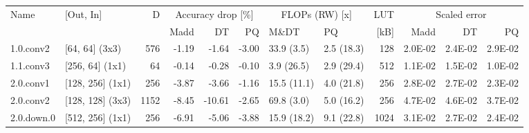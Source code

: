 \begin{table}
\centering
\begin{tabular}{llrrrrllrrrr}
\toprule
Name & [Out, In] & D & \multicolumn{3}{|c|}{Accuracy drop [\%]} & \multicolumn{2}{|c|}{FLOPs (RW) [x]} & LUT & \multicolumn{3}{|c|}{Scaled error} \\
 &  &  & Madd & DT & PQ & M\&DT & PQ & [kB] & Madd & DT & PQ \\
\midrule
1.0.conv2 & [64, 64] (3x3) & 576 & {\cellcolor[HTML]{F5FBB2}} \color[HTML]{000000} -1.19 & {\cellcolor[HTML]{FAFDB8}} \color[HTML]{000000} -1.64 & {\cellcolor[HTML]{FFF8B4}} \color[HTML]{000000} -3.00 & 33.9 (3.5) & 2.5 (18.3) & 128 & {\cellcolor[HTML]{F2FAAE}} \color[HTML]{000000} 2.0E-02 & {\cellcolor[HTML]{FFFEBE}} \color[HTML]{000000} 2.4E-02 & {\cellcolor[HTML]{FEEB9D}} \color[HTML]{000000} 2.9E-02 \\
1.1.conv3 & [256, 64] (1x1) & 64 & {\cellcolor[HTML]{EBF7A3}} \color[HTML]{000000} -0.14 & {\cellcolor[HTML]{ECF7A6}} \color[HTML]{000000} -0.28 & {\cellcolor[HTML]{E9F6A1}} \color[HTML]{000000} -0.10 & 3.9 (26.5) & 2.9 (29.4) & 512 & {\cellcolor[HTML]{C7E77F}} \color[HTML]{000000} 1.1E-02 & {\cellcolor[HTML]{DCF08F}} \color[HTML]{000000} 1.5E-02 & {\cellcolor[HTML]{C1E57B}} \color[HTML]{000000} 1.0E-02 \\
2.0.conv1 & [128, 256] (1x1) & 256 & {\cellcolor[HTML]{FFF1A8}} \color[HTML]{000000} -3.87 & {\cellcolor[HTML]{FFF2AA}} \color[HTML]{000000} -3.66 & {\cellcolor[HTML]{F5FBB2}} \color[HTML]{000000} -1.16 & 15.5 (11.1) & 4.0 (21.8) & 256 & {\cellcolor[HTML]{FFF1A8}} \color[HTML]{000000} 2.8E-02 & {\cellcolor[HTML]{FFF2AA}} \color[HTML]{000000} 2.7E-02 & {\cellcolor[HTML]{FDFEBC}} \color[HTML]{000000} 2.3E-02 \\
2.0.conv2 & [128, 128] (3x3) & 1152 & {\cellcolor[HTML]{FDBD6D}} \color[HTML]{000000} -8.45 & {\cellcolor[HTML]{FA9B58}} \color[HTML]{000000} -10.61 & {\cellcolor[HTML]{FFFBB8}} \color[HTML]{000000} -2.65 & 69.8 (3.0) & 5.0 (16.2) & 256 & {\cellcolor[HTML]{F7844E}} \color[HTML]{F1F1F1} 4.7E-02 & {\cellcolor[HTML]{F88C51}} \color[HTML]{F1F1F1} 4.6E-02 & {\cellcolor[HTML]{FDC776}} \color[HTML]{000000} 3.7E-02 \\
2.0.down.0 & [512, 256] (1x1) & 256 & {\cellcolor[HTML]{FED27F}} \color[HTML]{000000} -6.91 & {\cellcolor[HTML]{FEE797}} \color[HTML]{000000} -5.06 & {\cellcolor[HTML]{FFF1A8}} \color[HTML]{000000} -3.88 & 15.9 (18.2) & 9.1 (22.8) & 1024 & {\cellcolor[HTML]{FEE593}} \color[HTML]{000000} 3.1E-02 & {\cellcolor[HTML]{FFF2AA}} \color[HTML]{000000} 2.7E-02 & {\cellcolor[HTML]{FFFDBC}} \color[HTML]{000000} 2.4E-02 \\

\end{tabular}
\end{table}
